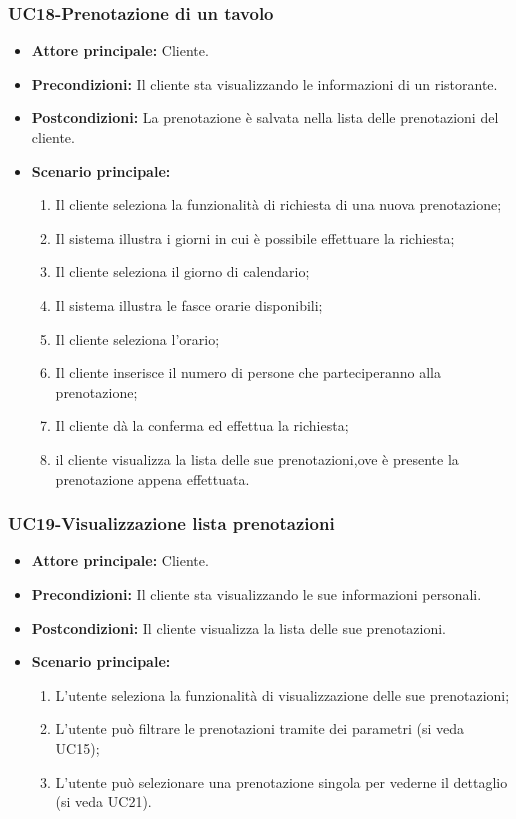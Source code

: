 \subsubsection{UC18-Prenotazione di un tavolo}
\begin{itemize}
    \item \textbf{Attore principale: }Cliente.
    \item \textbf{Precondizioni: }Il cliente sta visualizzando le informazioni di un ristorante.
    \item \textbf{Postcondizioni: }La prenotazione è salvata nella lista delle prenotazioni del cliente.
    \item \textbf{Scenario principale:}
        \begin{enumerate}
            \item Il cliente seleziona la funzionalità di richiesta di una nuova prenotazione;
            \item Il sistema illustra i giorni in cui è possibile effettuare la richiesta;
            \item Il cliente seleziona il giorno di calendario;
            \item Il sistema illustra le fasce orarie disponibili;
            \item Il cliente seleziona l'orario;
            \item Il cliente inserisce il numero di persone che parteciperanno alla prenotazione;
            \item Il cliente dà la conferma ed effettua la richiesta;
            \item il cliente visualizza la lista delle sue prenotazioni,ove è presente la prenotazione appena
            effettuata.
        \end{enumerate}
\end{itemize}

\subsubsection{UC19-Visualizzazione lista prenotazioni}
\begin{itemize}
    \item \textbf{Attore principale: } Cliente.
    \item \textbf{Precondizioni: }Il cliente sta visualizzando le sue informazioni personali.
    \item \textbf{Postcondizioni: }Il cliente visualizza la lista delle sue prenotazioni.
    \item \textbf{Scenario principale:}
        \begin{enumerate}
            \item L'utente seleziona la funzionalità di visualizzazione delle sue prenotazioni;
            \item L'utente può filtrare le prenotazioni tramite dei parametri (si veda UC15);
            \item L'utente può selezionare una prenotazione singola per vederne il dettaglio (si veda UC21).
        \end{enumerate}
\end{itemize}

